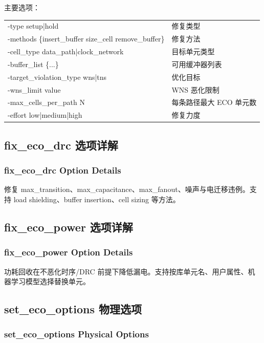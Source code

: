  主要选项：
\begin{longtable}{|L{0.32\textwidth}|L{0.6\textwidth}|}
\hline
{} &  \\
\hline
-type setup|hold & 修复类型 \\
-methods \{insert\_buffer size\_cell remove\_buffer\} & 修复方法 \\
-cell\_type data\_path|clock\_network & 目标单元类型 \\
-buffer\_list \{...\} & 可用缓冲器列表 \\
-target\_violation\_type wns|tns & 优化目标 \\
-wns\_limit value & WNS 恶化限制 \\
-max\_cells\_per\_path N & 每条路径最大 ECO 单元数 \\
-effort low|medium|high & 修复力度 \\
\hline
\end{longtable}

\subsection{fix_eco_drc 选项详解}
\subsubsection*{fix_eco_drc Option Details}

修复 max_transition、max_capacitance、max_fanout、噪声与电迁移违例。支持 load shielding、buffer insertion、cell sizing 等方法。

\subsection{fix_eco_power 选项详解}
\subsubsection*{fix_eco_power Option Details}

功耗回收在不恶化时序/DRC 前提下降低漏电。支持按库单元名、用户属性、机器学习模型选择替换单元。

\subsection{set_eco_options 物理选项}
\subsubsection*{set_eco_options Physical Options}

